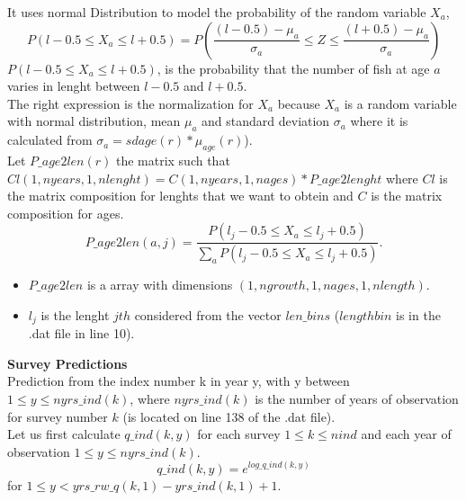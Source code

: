\documentclass{article}
\begin{document}
It uses normal Distribution to model the probability of the random variable $X_a$, 
\begin{equation}
    P(l-0.5\leq X_a\leq l+0.5 ) = P\left(\dfrac{(l-0.5)-\mu_a}{\sigma_a}\leq Z\leq\dfrac{(l+0.5)-\mu_a}{\sigma_a}\right)
\end{equation}
$P(l-0.5\leq X_a\leq l+0.5 )$, is the probability that the number of fish at age $a$ varies in lenght between  $l-0.5$ and $l+0.5$. \\
The right expression is the normalization for $X_a$ because $X_a$ is a random variable with normal distribution, mean $\mu_a$ and  standard deviation $\sigma_a$ where it is calculated from $\sigma_{a}=sdage(r)*\mu_{age}(r)$).\\
Let $P\_age2len(r)$ the matrix such that $Cl(1,nyears,1,nlenght)=C(1,nyears,1,nages)*P\_age2lenght$ where $Cl$ is the matrix composition for lenghts that we want to obtein and $C$ is the matrix composition for ages.
\begin{equation}
    P\_age2len(a,j) = \dfrac{P(l_j-0.5\leq X_a\leq l_j+0.5 )}{\sum_{a}P(l_j-0.5\leq X_a\leq l_j+0.5 )}.
\end{equation}

\begin{itemize}
    \item $P\_age2len$ is a array with dimensions  $(1,ngrowth,1,nages,1,nlength)$.
\end{itemize}
\begin{itemize}
    \item $l_j$ is the lenght $jth$ considered from the vector $len\_bins$ ($lengthbin$ is in the .dat file in
    line 10).
\end{itemize}

\textbf{Survey Predictions}\\
Prediction from the index number k in year y, with y between $1\leq y \leq nyrs\_ind(k)$, where $nyrs\_ind(k)$ is the number of years of observation for survey number $k$ (is located on line 138 of the .dat file).\\
Let us first calculate $q\_ind(k,y)$ for each survey $1\leq k \leq nind$ and each year of observation $1\leq y \leq nyrs\_ind(k)$.
\begin{equation}
    q\_ind(k,y)=e^{log\_q\_ind(k,y)}
\end{equation}
for $1\leq y < yrs\_rw\_q(k,1)-yrs\_ind(k,1)+1$.\\
\end{document}
